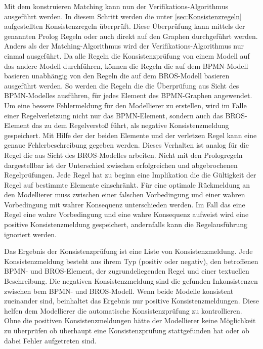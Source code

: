 Mit dem konstruieren Matching kann nun der Verifikations-Algorithmus ausgeführt werden.
In diesem Schritt werden die unter \cref{sec:Konsistenzregeln} aufgestellten Konsistenzregeln überprüft.
Diese Überprüfung kann mittels der genannten Prolog Regeln oder auch direkt auf den Graphen durchgeführt werden.
Anders als der Matching-Algorithmus wird der Verifikations-Algorithmus nur einmal ausgeführt.
Da alle Regeln die Konsistenzprüfung von einem Modell auf das andere Modell durchführen, können die Regeln die auf dem BPMN-Modell basieren unabhängig von den Regeln die auf dem BROS-Modell basieren ausgeführt werden.
So werden die Regeln die die Überprüfung aus Sicht des BPMN-Modelles ausführen, für jedes Element des BPMN-Graphen angewendet.
Um eine bessere Fehlermeldung für den Modellierer zu erstellen, wird im Falle einer Regelverletzung nicht nur das BPMN-Element, sondern auch das BROS-Element das zu dem Regelverstoß führt, als negative Konsistenzmeldung gespeichert.
Mit Hilfe der der beiden Elemente und der verletzen Regel kann eine genaue Fehlerbeschreibung gegeben werden.
Dieses Verhalten ist analog für die Regel die aus Sicht des BROS-Modelles arbeiten.
Nicht mit den Prologregeln dargestellbar ist der Unterschied zwischen erfolgreichen und abgebrochenen Regelprüfungen.
Jede Regel hat zu beginn eine Implikation die die Gültigkeit der Regel auf bestimmte Elemente einschränkt.
Für eine optimale Rückmeldung an den Modellierer muss zwischen einer falschen Vorbedingung und einer wahren Vorbedingung mit wahrer Konsequenz unterschieden werden.
Im Fall das eine Regel eine wahre Vorbedingung und eine wahre Konsequenz aufweist wird eine positive Konsistenzmeldung gespeichert, andernfalls kann die Regelausführung ignoriert werden.

Das Ergebnis der Konsistenzprüfung ist eine Liste von Konsistenzmeldung.
Jede Konsistenzmeldung besteht aus ihrem Typ (positiv oder negativ), den betroffenen BPMN- und BROS-Element, der zugrundeliegenden Regel und einer textuellen Beschreibung.
Die negativen Konsistenzmeldung sind die gefunden Inkonsistenzen zwischen bem BPMN- und BROS-Modell.
Wenn beide Modelle konsistent zueinander sind, beinhaltet das Ergebnis nur positive Konsistenzmeldungen.
Diese helfen dem Modellierer die automatische Konsistenzprüfung zu kontrollieren.
Ohne die positiven Konsistenzmeldungen hätte der Modellierer keine Möglichkeit zu überprüfen ob überhaupt eine Konsistenzprüfung stattgefunden hat oder ob dabei Fehler aufgetreten sind.
